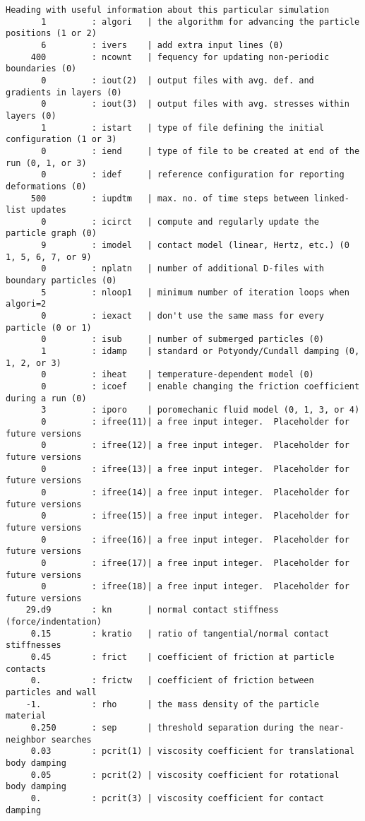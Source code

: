 \begin{verbatim}
Heading with useful information about this particular simulation
       1         : algori   | the algorithm for advancing the particle positions (1 or 2)
       6         : ivers    | add extra input lines (0)
     400         : ncownt   | fequency for updating non-periodic boundaries (0)
       0         : iout(2)  | output files with avg. def. and gradients in layers (0)
       0         : iout(3)  | output files with avg. stresses within layers (0)
       1         : istart   | type of file defining the initial configuration (1 or 3)
       0         : iend     | type of file to be created at end of the run (0, 1, or 3)
       0         : idef     | reference configuration for reporting deformations (0)
     500         : iupdtm   | max. no. of time steps between linked-list updates
       0         : icirct   | compute and regularly update the particle graph (0)
       9         : imodel   | contact model (linear, Hertz, etc.) (0 1, 5, 6, 7, or 9)
       0         : nplatn   | number of additional D-files with boundary particles (0)
       5         : nloop1   | minimum number of iteration loops when algori=2
       0         : iexact   | don't use the same mass for every particle (0 or 1)
       0         : isub     | number of submerged particles (0)
       1         : idamp    | standard or Potyondy/Cundall damping (0, 1, 2, or 3)
       0         : iheat    | temperature-dependent model (0)
       0         : icoef    | enable changing the friction coefficient during a run (0)
       3         : iporo    | poromechanic fluid model (0, 1, 3, or 4)
       0         : ifree(11)| a free input integer.  Placeholder for future versions
       0         : ifree(12)| a free input integer.  Placeholder for future versions
       0         : ifree(13)| a free input integer.  Placeholder for future versions
       0         : ifree(14)| a free input integer.  Placeholder for future versions
       0         : ifree(15)| a free input integer.  Placeholder for future versions
       0         : ifree(16)| a free input integer.  Placeholder for future versions
       0         : ifree(17)| a free input integer.  Placeholder for future versions
       0         : ifree(18)| a free input integer.  Placeholder for future versions
    29.d9        : kn       | normal contact stiffness (force/indentation)
     0.15        : kratio   | ratio of tangential/normal contact stiffnesses
     0.45        : frict    | coefficient of friction at particle contacts
     0.          : frictw   | coefficient of friction between particles and wall
    -1.          : rho      | the mass density of the particle material
     0.250       : sep      | threshold separation during the near-neighbor searches
     0.03        : pcrit(1) | viscosity coefficient for translational body damping
     0.05        : pcrit(2) | viscosity coefficient for rotational body damping
     0.          : pcrit(3) | viscosity coefficient for contact damping
\end{verbatim}
